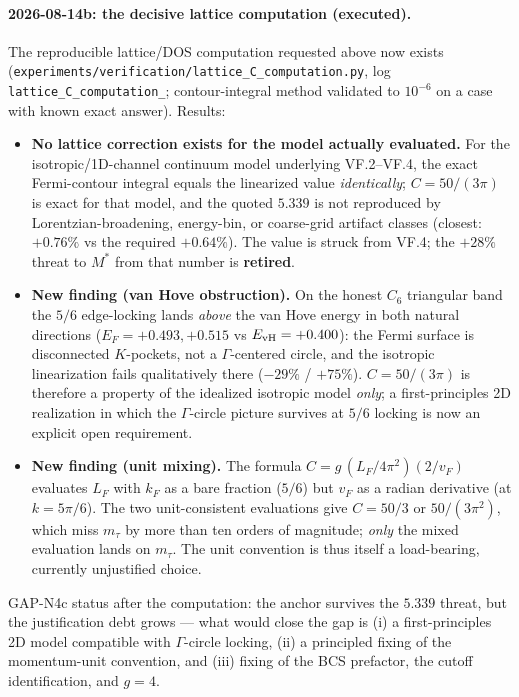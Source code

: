 \paragraph{2026-08-14b: the decisive lattice computation (executed).}
The reproducible lattice/DOS computation requested above now exists
(\texttt{experiments/\allowbreak verification/\allowbreak lattice\_\allowbreak C\_\allowbreak computation.py}, log
\texttt{lattice\_\allowbreak C\_\allowbreak computation\_}; contour-integral method validated to
$10^{-6}$ on a case with known exact answer). Results:
\begin{itemize}
\item \textbf{No lattice correction exists for the model actually evaluated.} For the
isotropic/1D-channel continuum model underlying VF.2--VF.4, the exact Fermi-contour
integral equals the linearized value \emph{identically}; $C=50/(3\pi)$ is exact for that
model, and the quoted $5.339$ is not reproduced by Lorentzian-broadening, energy-bin, or
coarse-grid artifact classes (closest: $+0.76\%$ vs the required $+0.64\%$). The value is
struck from VF.4; the $+28\%$ threat to $M^*$ from that number is \textbf{retired}.
\item \textbf{New finding (van Hove obstruction).} On the honest $C_6$ triangular band the
$5/6$ edge-locking lands \emph{above} the van Hove energy in both natural directions
($E_F = +0.493, +0.515$ vs $E_{\rm vH} = +0.400$): the Fermi surface is disconnected
$K$-pockets, not a $\Gamma$-centered circle, and the isotropic linearization fails
qualitatively there ($-29\%$ / $+75\%$). $C = 50/(3\pi)$ is therefore a property of the
idealized isotropic model \emph{only}; a first-principles 2D realization in which the
$\Gamma$-circle picture survives at $5/6$ locking is now an explicit open requirement.
\item \textbf{New finding (unit mixing).} The formula $C = g\,(L_F/4\pi^2)(2/v_F)$
evaluates $L_F$ with $k_F$ as a bare fraction ($5/6$) but $v_F$ as a radian derivative (at
$k=5\pi/6$). The two unit-consistent evaluations give $C = 50/3$ or $50/(3\pi^2)$, which
miss $m_\tau$ by more than ten orders of magnitude; \emph{only} the mixed evaluation lands
on $m_\tau$. The unit convention is thus itself a load-bearing, currently unjustified
choice.
\end{itemize}
GAP-N4c status after the computation: the anchor survives the $5.339$ threat, but the
justification debt grows --- what would close the gap is (i) a first-principles 2D model
compatible with $\Gamma$-circle locking, (ii) a principled fixing of the momentum-unit
convention, and (iii) fixing of the BCS prefactor, the cutoff identification, and $g=4$.

